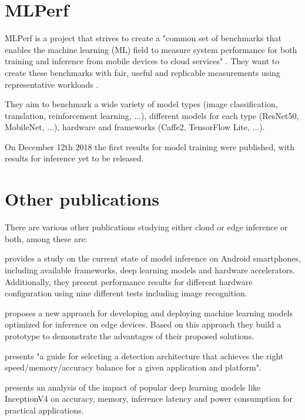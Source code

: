\section{MLPerf}
MLPerf is a project that strives to create a "common set of benchmarks that enables the machine learning (ML) field to measure system performance for both training and inference from mobile devices to cloud services" \cite{mlperfWebsite}.
They want to create these benchmarks with fair, useful and replicable  measurements using representative workloads \cite{mlperf}. 

They aim to benchmark a wide variety of model types (image classification, translation, reinforcement learning, ...), different models for each type (ResNet50, MobileNet, ...), hardware and frameworks (Caffe2, TensorFlow Lite, ...).

On December 12th 2018 the first results for model training were published, with results for inference yet to be released.


\section{Other publications}
There are various other publications studying either cloud or edge inference or both, among these are:



\cite{DBLP:journals/corr/abs-1810-01109} provides a study on the current state of model inference on Android smartphones, including available frameworks, deep learning models and hardware accelerators. Additionally, they present performance results for different hardware configuration using nine different tests including image recognition.

\cite{rethinkingDeployment} proposes a new approach for developing and deploying machine learning models optimized for inference on edge devices. Based on this approach they build a prototype to demonstrate the advantages of their proposed solutions.


\cite{DBLP:journals/corr/HuangRSZKFFWSG016} presents "a guide for selecting a detection architecture that achieves the right
speed/memory/accuracy balance for a given application and platform"\cite{DBLP:journals/corr/HuangRSZKFFWSG016}.



\cite{DBLP:journals/corr/CanzianiPC16} presents an analysis of the impact of popular deep learning models like InceptionV4 on accuracy, memory, inference latency and power consumption for practical applications.


